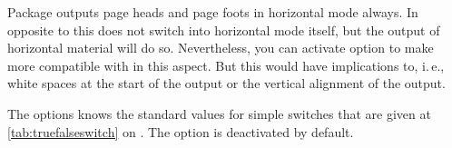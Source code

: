 \begin{Declaration}
\end{Declaration}
%
Package  outputs page heads and page foots in horizontal
mode always. In opposite to this  does not switch
into horizontal mode itself, but the output of horizontal material will do
so. Nevertheless, you can activate option  to make
 more compatible with  in this
aspect. But this would have implications to, i.\,e., white
spaces at the start of the output or the vertical alignment of the output.

The options knows the standard values for simple switches that are given at
\autoref{tab:truefalseswitch} on . The option
is deactivated by default.%
%
%
%

